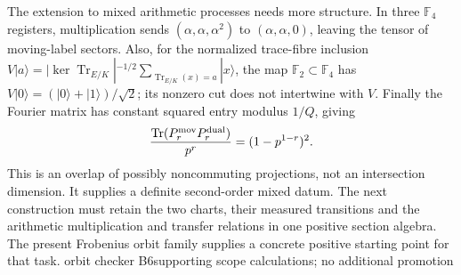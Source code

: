 The extension to mixed arithmetic processes needs more structure. In three
$\mathbb F_4$ registers, multiplication sends
$(\alpha,\alpha,\alpha^2)$ to $(\alpha,\alpha,0)$, leaving the tensor
of moving-label sectors. Also, for the normalized trace-fibre inclusion
$V|a\rangle=|\ker\operatorname{Tr}_{E/K}|^{-1/2}
\sum_{\operatorname{Tr}_{E/K}(x)=a}|x\rangle$, the map
$\mathbb F_2\subset\mathbb F_4$ has
$V|0\rangle=(|0\rangle+|1\rangle)/\sqrt2$; its nonzero cut does not
intertwine with $V$. Finally the Fourier matrix has constant squared
entry modulus $1/Q$, giving
\[
 \frac{\operatorname{Tr}(P_r^{\rm mov}P_r^{\rm dual})}{p^r}
 =(1-p^{1-r})^2.
\]
This is an overlap of possibly noncommuting projections, not an intersection
dimension. It supplies a definite second-order mixed datum. The next
construction must retain the two charts, their measured transitions and
the arithmetic multiplication and transfer relations in one positive
section algebra. The present Frobenius orbit family supplies a concrete
positive starting point for that task.
{orbit checker B6}{supporting scope calculations; no additional promotion}
